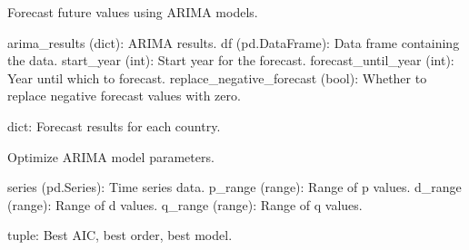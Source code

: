 \documentclass[letterpaper,10pt,english]{sphinxmanual}
\begin{document}
\begin{fulllineitems}
\label{\detokenize{Arima:Arima.forecast_future}}
\pysigstartsignatures
{}
\pysigstopsignatures
\sphinxAtStartPar
Forecast future values using ARIMA models.
\begin{description}
\sphinxAtStartPar
arima\_results (dict): ARIMA results.
df (pd.DataFrame): Data frame containing the data.
start\_year (int): Start year for the forecast.
forecast\_until\_year (int): Year until which to forecast.
replace\_negative\_forecast (bool): Whether to replace negative forecast values with zero.

\sphinxAtStartPar
dict: Forecast results for each country.

\end{description}

\end{fulllineitems}


\begin{fulllineitems}
\label{\detokenize{Arima:Arima.optimize_arima}}
\pysigstartsignatures
{}
\pysigstopsignatures
\sphinxAtStartPar
Optimize ARIMA model parameters.
\begin{description}
\sphinxAtStartPar
series (pd.Series): Time series data.
p\_range (range): Range of p values.
d\_range (range): Range of d values.
q\_range (range): Range of q values.

\sphinxAtStartPar
tuple: Best AIC, best order, best model.

\end{description}

\end{fulllineitems}
\end{document}
